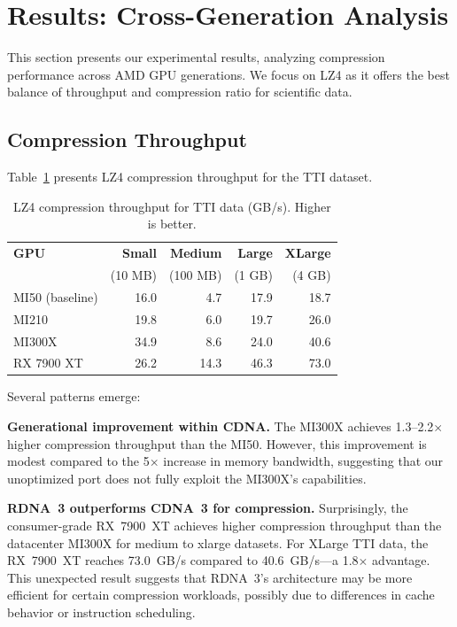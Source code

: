 \documentclass[runningheads]{llncs}
\begin{document}
%



\section{Results: Cross-Generation Analysis}
\label{sec:results}

This section presents our experimental results, analyzing compression performance across AMD GPU generations. We focus on LZ4 as it offers the best balance of throughput and compression ratio for scientific data.

\subsection{Compression Throughput}

Table~\ref{tab:comp_lz4} presents LZ4 compression throughput for the TTI dataset.

\begin{table}[t]
\centering
\caption{LZ4 compression throughput for TTI data (GB/s). Higher is better.}
\label{tab:comp_lz4}
\begin{tabular}{lrrrr}
\toprule
\textbf{GPU} & \textbf{Small} & \textbf{Medium} & \textbf{Large} & \textbf{XLarge} \\
 & (10 MB) & (100 MB) & (1 GB) & (4 GB) \\
\midrule
MI50 (baseline) & 16.0 & 4.7 & 17.9 & 18.7 \\
MI210 & 19.8 & 6.0 & 19.7 & 26.0 \\
MI300X & 34.9 & 8.6 & 24.0 & 40.6 \\
RX 7900 XT & 26.2 & 14.3 & 46.3 & 73.0 \\
\bottomrule
\end{tabular}
\end{table}

Several patterns emerge:

\textbf{Generational improvement within CDNA.} The MI300X achieves 1.3--2.2$\times$ higher compression throughput than the MI50. However, this improvement is modest compared to the 5$\times$ increase in memory bandwidth, suggesting that our unoptimized port does not fully exploit the MI300X's capabilities.

\textbf{RDNA~3 outperforms CDNA~3 for compression.} Surprisingly, the consumer-grade RX~7900~XT achieves higher compression throughput than the datacenter MI300X for medium to xlarge datasets. For XLarge TTI data, the RX~7900~XT reaches 73.0~GB/s compared to 40.6~GB/s---a 1.8$\times$ advantage. This unexpected result suggests that RDNA~3's architecture may be more efficient for certain compression workloads, possibly due to differences in cache behavior or instruction scheduling.
\end{document}
